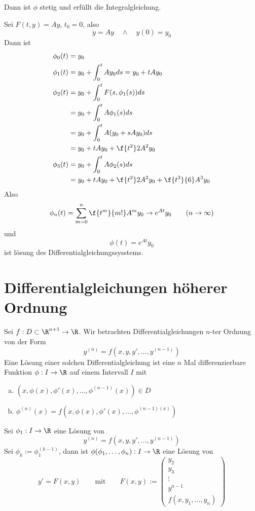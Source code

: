 \documentclass[a4paper,10pt]{scrbook}
\begin{document}
Dann ist $\phi$ stetig und erfüllt die Integralgleichung.


\begin{ex*}
	Sei $F(t,y) = Ay$, $t_0=0$, also
	\[
		\dot y = Ay \quad \land \quad y(0) = y_0
	\]
	Dann ist
	\begin{align*}
		\phi_0(t) &= y_0\\
		\phi_1(t) &= y_0 + \int_0^t Ay_0 ds = y_0 + tAy_0\\
		\phi_2(t) &= y_0 + \int_0^t F(s,\phi_1(s)) ds \\
							  &= y_0 + \int_0^t A\phi_1(s) ds\\
					 &=y_0 + \int_0^t A(y_0+sAy_0)ds\\
			   &= y_0 + tAy_0 +\f {t^2}2 A^2y_0\\
		\phi_3(t) &= y_0 + \int_0^t A\phi_2(s) ds\\
									   &= y_0 + tAy_0 + \f{t^2}2 A^2y_0 + \f{t^3}{6} A^3y_0
	\end{align*}
	Also
	\[
		\phi_n(t) = \sum_{m=0}^n\f{t^m}{m!}A^m y_0 \to e^{At}y_0 \qquad (n\to \infty)
	\]
	und
	\[
		\phi(t) = e^{At}y_0
	\]
	ist lösung des Differentialgleichungssysstems.
\end{ex*}


\section{Differentialgleichungen höherer Ordnung}


Sei $f:D\subset \R^{n+1}\to \R$.
Wir betrachten Differentialgleichungen $n$-ter Ordnung von der Form
\[
	y^{(n)} = f(x,y,y',\dotsc,y^{(n-1)})
\]
Eine Lösung einer solchen Differentialgleichung ist eine $n$ Mal differenzierbare Funktion $\phi : I\to \R$ auf einem Intervall $I$ mit
\begin{enumerate}[(a)]
	\item
		$(x,\phi(x),\phi'(x),\dotsc,\phi^{(n-1)}(x)) \in D$
	\item
		$\phi^{(n)}(x) = f(x,\phi(x),\phi'(x), \dotsc, \phi^{(n-1)(x)})$
\end{enumerate}

Sei $\phi_1 : I\to \R$ eine Lösung von
\[
	y^{(n)} = f(x,y,y',\dotsc,y^{(n-1)})
\]
Sei $\phi_k := \phi_1^{(k-1)}$, dann ist $\phi(\phi_1,\dotsc, \phi_n) : I \to \R$ eine Lösung von
\[
	y' = F(x,y) \qquad \text{mit} \qquad F(x,y) := \begin{pmatrix}y_2 \\ y_3 \\\vdots\\ y^{n-1}\\f(x,y_1,\dotsc,y_n)\end{pmatrix}
\]
\end{document}
